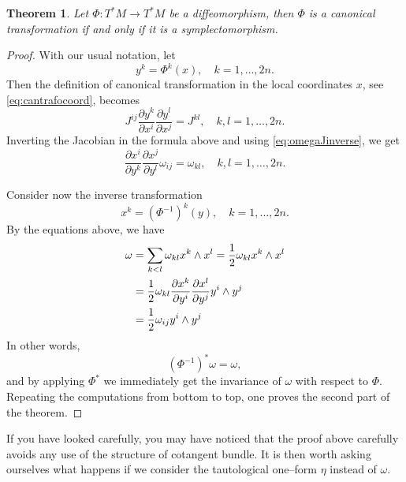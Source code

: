 \documentclass[english,fontsize=11pt,paper=a5,oneside]{scrbook}
\let\d\relax
\newcommand{\d}{\mathrm{d}}
\newtheorem{theorem}{Theorem}[chapter]
\theoremstyle{definition}
\begin{document}
\begin{theorem}\label{thm:ctiffs}
  Let $\Phi: T^*M \to T^*M$ be a diffeomorphism, then $\Phi$ is a canonical transformation if and only if it is a symplectomorphism.
\end{theorem}
\begin{proof}
  With our usual notation, let
  \begin{equation}
    y^k = \Phi^k(x),\quad k=1,\ldots,2n.
  \end{equation}
  Then the definition of canonical transformation in the local coordinates $x$, see \eqref{eq:cantrafocoord}, becomes
  \begin{equation}
    J^{ij}\frac{\partial y^k}{\partial x^i}\frac{\partial y^l}{\partial x^j} = J^{kl},
    \quad k,l = 1,\ldots,2n.
  \end{equation}
  Inverting the Jacobian in the formula above and using \eqref{eq:omegaJinverse}, we get
  \begin{equation}
    \frac{\partial x^i}{\partial y^k}\frac{\partial x^j}{\partial y^l} \omega_{ij}= \omega_{kl},
    \quad k,l = 1,\ldots,2n.
  \end{equation}

  Consider now the inverse transformation
  \begin{equation}
    x^k = \left(\Phi^{-1}\right)^k(y),\quad k=1,\ldots,2n.
  \end{equation}
  By the equations above, we have
  \begin{align}
    \omega
     & = \sum_{k<l} \omega_{kl}\d x^k \wedge \d x^l
    = \frac12 \omega_{kl} \d x^k \wedge \d x^l                                                                       \\
     & = \frac12 \omega_{kl} \frac{\partial x^k}{\partial y^i}\frac{\partial x^l}{\partial y^j} \d y^i \wedge \d y^j \\
     & = \frac12 \omega_{ij} \d y^i \wedge \d y^j
  \end{align}
  In other words,
  \begin{equation}
    \left(\Phi^{-1}\right)^* \omega = \omega,
  \end{equation}
  and by applying $\Phi^*$ we immediately get the invariance of $\omega$ with respect to $\Phi$.
  Repeating the computations from bottom to top, one proves the second part of the theorem.
\end{proof}

If you have looked carefully, you may have noticed that the proof above carefully avoids any use of the structure of cotangent bundle.
It is then worth asking ourselves what happens if we consider the tautological one--form $\eta$ instead of $\omega$.
\end{document}
